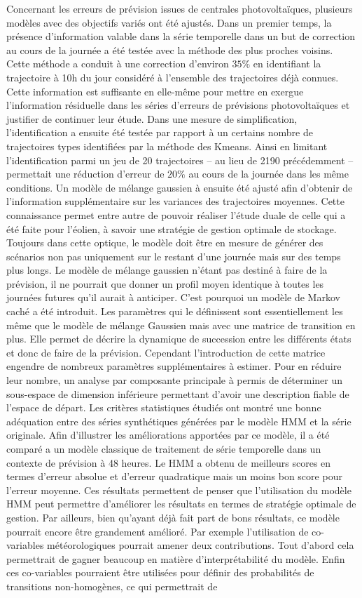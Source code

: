 \documentclass[12pt, french]{report}
\begin{document}
Concernant les erreurs de prévision issues de centrales photovoltaïques, plusieurs modèles avec des objectifs variés ont été ajustés. Dans un premier temps, la présence d'information valable dans la série temporelle dans un but de correction au cours de la journée a été testée avec la méthode des plus proches voisins. Cette méthode a conduit à une correction d'environ $35 \%$ en identifiant la trajectoire à 10h du jour considéré à l'ensemble des trajectoires déjà connues. Cette information est suffisante en elle-même pour mettre en exergue l'information résiduelle dans les séries d'erreurs de prévisions photovoltaïques et justifier de continuer leur étude. Dans une mesure de simplification, l'identification a ensuite été testée par rapport à un certains nombre de trajectoires types identifiées par la méthode des Kmeans. Ainsi en limitant l'identification parmi un jeu de 20 trajectoires -- au lieu de 2190 précédemment -- permettait une réduction d'erreur de $20 \%$ au cours de la journée dans les même conditions. Un modèle de mélange gaussien à ensuite été ajusté afin d'obtenir de l'information supplémentaire sur les variances des trajectoires moyennes. Cette connaissance permet entre autre de pouvoir réaliser l'étude duale de celle qui a été faite pour l'éolien, à savoir une stratégie de gestion optimale de stockage. Toujours dans cette optique, le modèle doit être en mesure de générer des scénarios non pas uniquement sur le restant d'une journée mais sur des temps plus longs. Le modèle de mélange gaussien n'étant pas destiné à faire de la prévision, il ne pourrait que donner un profil moyen identique à toutes les journées futures qu'il aurait à anticiper. C'est pourquoi un modèle de Markov caché a été introduit. Les paramètres qui le définissent sont essentiellement les même que le modèle de mélange Gaussien mais avec une matrice de transition en plus. Elle permet de décrire la dynamique de succession entre les différents états et donc de faire de la prévision. Cependant l'introduction de cette matrice engendre de nombreux paramètres supplémentaires à estimer. Pour en réduire leur nombre, un analyse par composante principale à permis de déterminer un sous-espace de dimension inférieure permettant d'avoir une description fiable de l'espace de départ. Les critères statistiques étudiés ont montré une bonne adéquation entre des séries synthétiques générées par le modèle HMM et la série originale. Afin d'illustrer les améliorations apportées par ce modèle, il a été comparé a un modèle classique de traitement de série temporelle dans un contexte de prévision à 48 heures. Le HMM a obtenu de meilleurs scores en termes d'erreur absolue et d'erreur quadratique mais un moins bon score pour l'erreur moyenne. Ces résultats permettent de penser que l'utilisation du modèle HMM peut permettre d'améliorer les résultats en termes de stratégie optimale de gestion.  Par ailleurs, bien qu'ayant déjà fait part de bons résultats, ce modèle pourrait encore être grandement amélioré. Par exemple l'utilisation de co-variables météorologiques pourrait amener deux contributions. Tout d'abord cela permettrait de gagner beaucoup en matière d'interprétabilité du modèle. Enfin ces co-variables pourraient être utilisées pour définir des probabilités de transitions non-homogènes, ce qui permettrait de 
\end{document}
